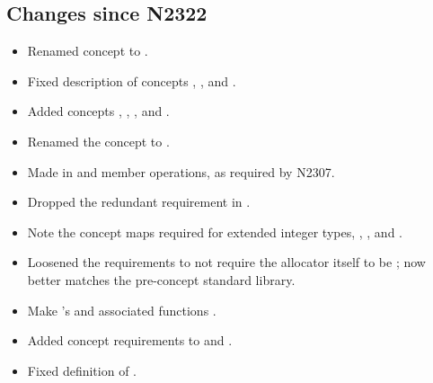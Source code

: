 \documentclass[american,twoside]{book}
\begin{document}
\begin{titlepage}
\section*{Changes since N2322}
\begin{itemize}
\item Renamed  concept to .
\item Fixed description of concepts ,
  , and .
\item Added concepts , , ,
  and .
\item Renamed the  concept to .
\item Made  in  and
   member operations, as required by N2307.
\item Dropped the redundant  requirement in
  . 
\item Note the concept maps required for extended integer types,
  , , and .
\item Loosened the  requirements to not require the
  allocator itself to be ;  now
  better matches the pre-concept standard library.
\item Make 's  and 
  associated functions .
\item Added concept requirements to  and
  .
\item Fixed definition of .
\end{itemize}

\end{titlepage}

\pagestyle{fancy}
\fancyhead[LE,RO]{\textbf{\rightmark}}
\fancyhead[RE]{\textbf{\leftmark\hspace{1em}\thepage}}
\fancyhead[LO]{\textbf{\thepage\hspace{1em}\leftmark}}


\renewcommand{\sectionmark}[1]{\markright{\thesection\hspace{1em}#1}}
\renewcommand{\chaptermark}[1]{\markboth{#1}{}}
\end{document}
